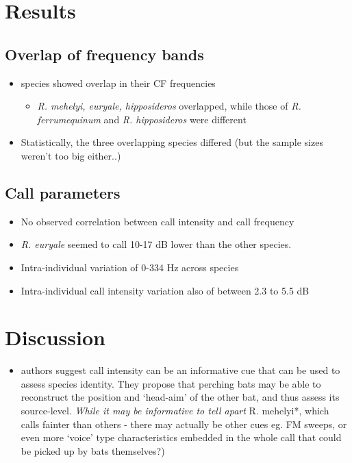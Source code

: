\documentclass[
]{book}
\providecommand{\tightlist}{%
  \setlength{\itemsep}{0pt}\setlength{\parskip}{0pt}}
\begin{document}
\hypertarget{results}{%
\section{Results}\label{results}}

\hypertarget{overlap-of-frequency-bands}{%
\subsection{Overlap of frequency bands}\label{overlap-of-frequency-bands}}

\begin{itemize}
\tightlist
\item
  species showed overlap in their CF frequencies

  \begin{itemize}
  \tightlist
  \item
    \emph{R. mehelyi, euryale, hipposideros} overlapped, while those of \emph{R. ferrumequinum} and \emph{R. hipposideros} were different
  \end{itemize}
\item
  Statistically, the three overlapping species differed (but the sample sizes weren't too big either..)
\end{itemize}

\hypertarget{call-parameters}{%
\subsection{Call parameters}\label{call-parameters}}

\begin{itemize}
\tightlist
\item
  No observed correlation between call intensity and call frequency
\item
  \emph{R. euryale} seemed to call 10-17 dB lower than the other species.
\item
  Intra-individual variation of 0-334 Hz across species
\item
  Intra-individual call intensity variation also of between 2.3 to 5.5 dB
\end{itemize}

\hypertarget{discussion}{%
\section{Discussion}\label{discussion}}

\begin{itemize}
\tightlist
\item
  authors suggest call intensity can be an informative cue that can be used to assess species identity. They propose that perching bats may be able to reconstruct the position and `head-aim' of the other bat, and thus assess its source-level. \emph{While it may be informative to tell apart }R. mehelyi*, which calls fainter than others - there may actually be other cues eg. FM sweeps, or even more `voice' type characteristics embedded in the whole call that could be picked up by bats themselves?)
\end{itemize}
\end{document}

